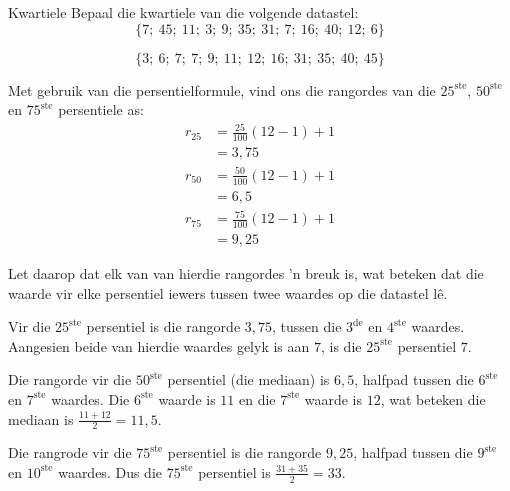 
\begin{wex}{Kwartiele}
{Bepaal die kwartiele van die volgende datastel:
    \begin{equation*}
      \{7;\ 45;\ 11;\ 3;\ 9;\ 35;\ 31;\ 7;\ 16;\ 40;\ 12;\ 6\}
    \end{equation*}
}{
    \begin{equation*}
      \{3;\ 6;\ 7;\ 7;\ 9;\ 11;\ 12;\ 16;\ 31;\ 35;\ 40;\ 45\}
    \end{equation*}


    Met gebruik van die persentielformule, vind ons die rangordes van die $25^{\mathrm{ste}}$,
    $50^{\mathrm{ste}}$ en $75^{\mathrm{ste}}$ persentiele as:
    \begin{align*}
      r_{25} &= \frac{25}{100}\left(12-1\right)+1 \\
            &= 3,75 \\
      r_{50} &= \frac{50}{100}\left(12-1\right)+1 \\
            &= 6,5 \\
      r_{75} &= \frac{75}{100}\left(12-1\right)+1 \\
            &= 9,25
    \end{align*}


    Let daarop dat elk van van hierdie rangordes ’n breuk is, wat beteken dat die waarde vir elke persentiel iewers tussen twee waardes op die datastel lê. 

    Vir die $25^{\mathrm{ste}}$ persentiel is die rangorde $3,75$, tussen die $3^{\mathrm{de}}$ en $4^{\mathrm{ste}}$ waardes. Aangesien beide van hierdie waardes gelyk is aan 
    $7$, is die $25^{\mathrm{ste}}$ persentiel $7$.

    Die rangorde vir die $50^{\mathrm{ste}}$ persentiel (die mediaan) is $6,5$, halfpad tussen die  $6^{\mathrm{ste}}$ en $7^{\mathrm{ste}}$ waardes. Die $6^{\mathrm{ste}}$ waarde is
    $11$ en die $7^{\mathrm{ste}}$ waarde is $12$, wat beteken die mediaan is
    \(\frac{11+12}{2} = 11,5\).

    Die rangrode vir die $75^{\mathrm{ste}}$ persentiel is die rangorde $9,25$, halfpad tussen die
    $9^{\mathrm{ste}}$ en $10^{\mathrm{ste}}$ waardes. Dus die $75^{\mathrm{ste}}$ persentiel is
    \(\frac{31+35}{2} = 33\).
  }
\end{wex}
